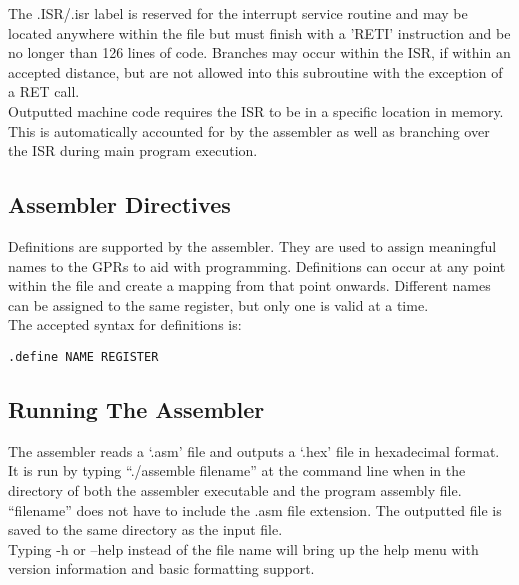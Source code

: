 \noindent The .ISR/.isr label is reserved for the interrupt service routine and may be located anywhere within the file but must finish with a 'RETI' instruction and be no longer than 126 lines of code. 
Branches may occur within the ISR, if within an accepted distance, but are not allowed into this subroutine with the exception of a RET call. \\

\noindent Outputted machine code requires the ISR to be in a specific location in memory. This is automatically accounted for by the assembler as well as branching over the ISR during main program execution.

\subsection{Assembler Directives}
Definitions are supported by the assembler. 
They are used to assign meaningful names to the GPRs to aid with programming.
Definitions can occur at any point within the file and create a mapping from that point onwards. 
Different names can be assigned to the same register, but only one is valid at a time. \\


\noindent The accepted syntax for definitions is:

\begin{center}\texttt{.define NAME REGISTER}\end{center}

\subsection{Running The Assembler}
The assembler reads a `.asm' file and outputs a `.hex' file in hexadecimal format. 
It is run by typing ``./assemble filename'' at the command line when in the directory of both the assembler executable and the program assembly file. ``filename'' does not have to include the .asm file extension. 
The outputted file is saved to the same directory as the input file. \\
\noindent Typing -h or --help instead of the file name will bring up the help menu with version information and basic formatting support. 

